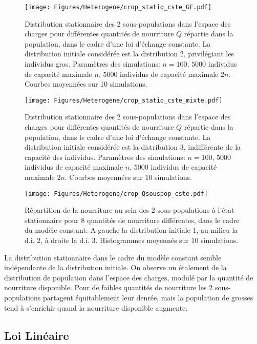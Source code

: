 \begin{figure}[h!]
\centering
\texttt{[image: Figures/Heterogene/crop\_statio\_cste\_GF.pdf]}
\caption{Distribution stationnaire des 2 sous-populations dans l'espace des charges pour différentes quantités de nourriture $Q$ répartie dans la population, dans le cadre d'une loi d'échange constante. La distribution initiale considérée est la distribution 2, privilégiant les individus gros. Paramètres des simulations: $n=100$, $5000$ individus de capacité maximale $n$, $5000$ individus de capacité maximale $2n$. Courbes moyennées sur 10 simulations.}
\label{statio_cste_GF}
\end{figure}

\begin{figure}[h!]
\centering
\texttt{[image: Figures/Heterogene/crop\_statio\_cste\_mixte.pdf]}
\caption{Distribution stationnaire des 2 sous-populations dans l'espace des charges pour différentes quantités de nourriture $Q$ répartie dans la population, dans le cadre d'une loi d'échange constante. La distribution initiale considérée est la distribution 3, indifférente de la capacité des individus. Paramètres des simulations: $n=100$, $5000$ individus de capacité maximale $n$, $5000$ individus de capacité maximale $2n$. Courbes moyennées sur 10 simulations.}
\label{statio_cste_mixte}
\end{figure}

\begin{figure}[h!]
\centering
\texttt{[image: Figures/Heterogene/crop\_Qsouspop\_cste.pdf]}
\caption{Répartition de la nourriture au sein des 2 sous-populations à l'état stationnaire pour 8 quantités de nourriture différentes, dans le cadre du modèle constant. A gauche la distribution initiale 1, au milieu la d.i. 2, à droite la d.i. 3. Histogrammes moyennés sur 10 simulations.}
\label{Qsouspop_cste}
\end{figure}


La distribution stationnaire dans le cadre du modèle constant semble indépendante de la distribution initiale. On observe un étalement de la distribution de population dans l'espace des charges, modulé par la quantité de nourriture disponible. Pour de faibles quantités de nourriture les 2 sous-populations partagent équitablement leur denrée, mais la population de grosses tend à s'enrichir quand la nourriture disponible augmente.

\clearpage

\subsection{Loi Linéaire}

